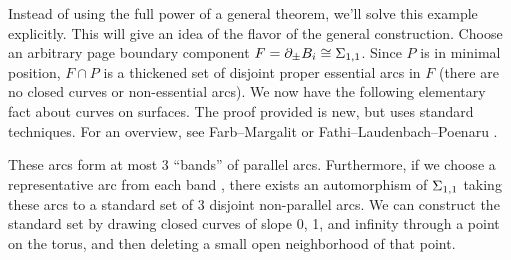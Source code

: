 Instead of using the full power of a general theorem, we'll solve this example
explicitly. This will give an idea of the flavor of the general construction.
Choose an arbitrary page boundary component $F=\partial_\pm B_i \cong \Sigma_{1,1}$.
Since $P$ is in minimal position, $F \cap P$ is a thickened set of disjoint
proper essential arcs in $F$ (there are no closed curves or non-essential
arcs).  We now have the following elementary fact about curves on surfaces.
The proof provided is new, but uses standard techniques. For an overview, see
Farb--Margalit \cite{FM} or Fathi--Laudenbach--Poenaru \cite{FLP}.

\begin{lemma}\label{L:ex1.1}

These arcs form at most 3 ``bands'' of parallel arcs. Furthermore, if we choose
a representative arc from each band , there exists an automorphism of
$\Sigma_{1,1}$ taking these arcs to a standard set of 3 disjoint non-parallel
arcs. We can construct the standard set by drawing closed curves of slope 0, 1,
and infinity through a point on the torus, and then deleting a small open
neighborhood of that point.

\end{lemma}
